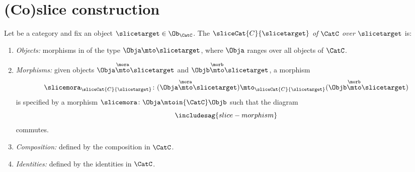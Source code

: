
\section{(Co)slice construction}



\begin{ctdefinition}
\label{def:slice-category}
   
    Let \CatC be a category and fix an object $\slicetarget \in \Ob_\CatC$. The  $\sliceCat{C}{\slicetarget}$ \emph{of} $\CatC$ \emph{over} $\slicetarget$ is: 
    \begin{enumerate}
        \item \emph{Objects:} morphisms in \CatC of the type $\Obja \mto \slicetarget$, where $\Obja$ ranges over all objects of $\CatC$. 
        \item \emph{Morphisms:} given objects $\Obja \overset{\mora}{\mto} \slicetarget$ and $\Objb \overset{\morb}{\mto} \slicetarget$, a morphism 
        \begin{equation}
\slicemora_{\sliceCat{C}{\slicetarget}} \colon (\Obja \overset{\mora}{\mto} \slicetarget) \mto_{\sliceCat{C}{\slicetarget}} (\Objb \overset{\morb}{\mto} \slicetarget)
\end{equation}
is specified by a morphism $\slicemora \colon \Obja \mtoin{\CatC} \Objb$ such that the diagram
\begin{equation}\label{eq:slice-morphism}
\includesag{slice-morphism}
\end{equation}
commutes. 

\item \emph{Composition:} defined by the composition in $\CatC$.  
\item \emph{Identities:} defined by the identities in $\CatC$. 
\end{enumerate}
\end{ctdefinition}




